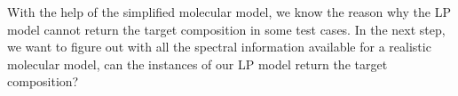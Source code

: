 With the help of the simplified molecular model, we know the reason why the LP model cannot return the target composition in some test cases. In the next step, we want to figure out with all the spectral information available for a realistic molecular model, can the  instances of our LP model return the target composition?



		

		 



